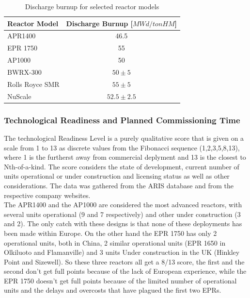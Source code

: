 \begin{table}[!ht]
    \centering
    \begin{tabularx}{\textwidth}{X c}
        \toprule
        \textbf{Reactor Model} & \textbf{Discharge Burnup [$MWd/tonHM$]} \\
        \midrule
        APR1400         & 46.5 \\
        EPR 1750        & 55 \\
        AP1000          & 50 \\
        BWRX-300        & $50 \pm 5$ \\
        Rolls Royce SMR & $55 \pm 5$ \\
        NuScale         & $52.5 \pm 2.5$ \\
        \bottomrule
    \end{tabularx}
    \caption{Discharge burnup for selected reactor models}
    \label{tab:reactor-burnup}
\end{table}





\subsubsection{Technological Readiness and Planned Commissioning Time}
The technological Readiness Level is a purely qualitative score that is given on a scale from 1 to 13 as discrete values from the Fibonacci sequence (1,2,3,5,8,13), where 1 is the furtherst away from commercial deplyment and 13 is the closest to Nth-of-a-kind. The score considers the state of development, current number of units operational or under construction and licensing status as well as other considerations. The data was gathered from the ARIS database \cite{iaea2025aris} and from the respective company websites. \\

The APR1400 and the AP1000 are considered the most advanced reactors, with several units operational (9 and 7 respectively) and other under construction (3 and 2). The only catch with these designs is that none of these deployments has been made within Europe. On the other hand the EPR 1750 has only 2 operational units, both in China, 2 similar operational units (EPR 1650 in Olkiluoto and Flamanville) and 3 units Under construction in the UK (Hinkley Point and Sizewell). So these three reactors all get a 8/13 score, the first and the second don't get full points because of the lack of European experience, while the EPR 1750 doesn't get full points because of the limited number of operational units and the delays and overcosts that have plagued the first two EPRs. \\

